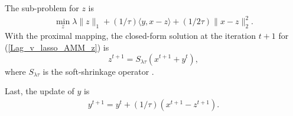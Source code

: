 \documentclass{article}
\begin{document}
The sub-problem for $z$ is
\begin{equation}
\label{Lag_v_lasso_AMM_z}
\begin{split}
\min_z \lambda\|z\|_1+(1/\tau)\langle y,x-z \rangle+(1/2 \tau) \|x-z\|^2_2.
\end{split}
\end{equation}
With the proximal mapping, the closed-form solution at the iteration $t+1$ for (\ref{Lag_v_lasso_AMM_z}) is
\begin{equation}
\label{Lag_v_lasso_AMM_z_ans}
z^{t+1}=S_{\lambda \tau}(x^{t+1}+y^t),
\end{equation}
where $S_{\lambda\tau}$ is the soft-shrinkage operator \cite{gonoho1995denoising}.
\begin{comment}
The sub-problem for $P^{L_1}M$ is 
\begin{equation}
\label{Lag_v_lasso_AMM_M}
\begin{split}
\min_{P^{L_1}M} (1/2)\|A_MP^{L_1}Mx-b\|^2_2,
\end{split}
\end{equation}
We also utilize the proximal gradient to solve (\ref{Lag_v_lasso_AMM_M}). Since the overall projection is a collection of block-wise projection $P_k^{L_1}M_k$ for $k$-th class, the closed-form solution for $k$-th class at $t+1$ iteration is 
\begin{equation}
\label{Lag_v_lasso_AMM_M_ans}
\begin{split}
M_k^{t+1} = (P^{L_1}_k)^{t}M_k^{t}+\mu x_k^{t+1} A_k^T(b-A_k(P^{L_1})^tM_k^tx_k),
\end{split}
\end{equation}
\begin{equation}
\label{Lag_v_lasso_AMM_P_ans}
\begin{split}
(P_k^{L_1})^{t+1} = diag(softmax(M_k^{t+1})),
\end{split}
\end{equation}
where the sub-index $k$ denotes the block w.r.t. $k$-th class. $diag()$ is the diagonalization operation. $softmax()$ is a popular way to project a vector onto a $L_1$ ball. $\mu$ is the step length in the proximal gradient. Since masking of each class is independent, the reweighting could be done in a parallel way. Therefore, the reweighting is light.
\end{comment}
Last, the update of $y$ is 
\begin{equation}
\label{Lag_v_lasso_AMM_y}
\begin{split}
y^{t+1}=y^t+(1/\tau)(x^{t+1}-z^{t+1}).
\end{split}
\end{equation}
\end{document}
